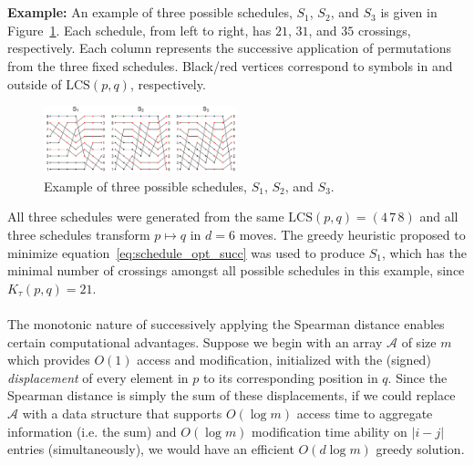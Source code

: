 \documentclass{siamart190516}
\begin{document}
\\
\\
\noindent \textbf{Example:} An example of three possible schedules, $S_1$, $S_2$, and $S_3$ is given in Figure~\ref{fig:crossings}. Each schedule, from left to right, has $21$, $31$, and $35$ crossings, respectively. Each column represents the successive application of permutations from the three fixed schedules. Black/red vertices correspond to symbols in and outside of $\mathrm{LCS}(p,q)$, respectively. 
\begin{figure}[ht]
    \centering
    \includegraphics[width=0.50\textwidth]{crossings.png}
    \caption{Example of three possible schedules, $S_1$, $S_2$, and $S_3$.}
    \label{fig:crossings}
\end{figure}
All three schedules were generated from the same $\mathrm{LCS}(p,q) = (4\,7\,8)$ and all three schedules transform $p \mapsto q$ in $d = 6$ moves. The greedy heuristic proposed to minimize equation~\ref{eq:schedule_opt_succ} was used to produce $S_1$, which has the minimal number of crossings amongst all possible schedules in this example, since $K_\tau(p,q) = 21$. 
\\
\\
\noindent 
The monotonic nature of successively applying the Spearman distance enables certain computational advantages. Suppose we begin with an array $\mathcal{A}$ of size $m$ which provides $O(1)$ access and modification, initialized with the (signed) \emph{displacement} of every element in $p$ to its corresponding position in $q$. Since the Spearman distance is simply the sum of these displacements, if we could replace $\mathcal{A}$ with a data structure that supports $O(\log m)$ access time to aggregate information (i.e. the sum) and $O(\log m)$ modification time ability on $\lvert i - j \vert$ entries (simultaneously), we would have an efficient $O(d \log m)$ greedy solution. 
\end{document}
